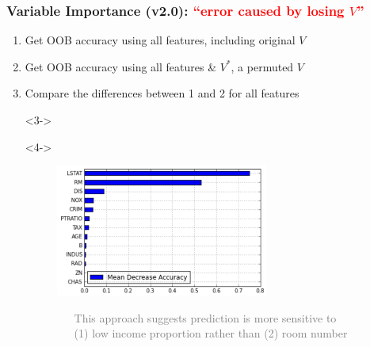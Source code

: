 \documentclass[xcolor={dvipsnames}]{beamer}
\begin{document}
\frame
{
\frametitle{Variable Importance (v2.0): \textcolor{red}{``error caused by losing $V$''}}
\begin{enumerate}
\item<1-> Get OOB accuracy using all features, including original $V$
\item<2-> Get OOB accuracy using all features \& $V^*$, a permuted $V$
\item<3-> Compare the differences between 1 and 2 for all features 
\item[]<3->%
\item[]<4->
\begin{figure}
\centering
\includegraphics[width=2.75in]{stuffs/boston2.png}

\footnotesize
\textcolor{gray}{$\quad\;\;$This approach suggests prediction is more sensitive to \\$\quad\;\;$(1)  low income proportion rather than (2) room number}

\end{figure}
\end{enumerate}
}
\end{document}
